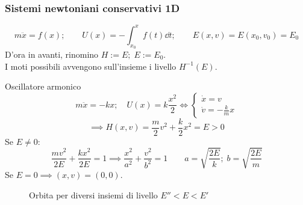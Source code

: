 \subsubsection{Sistemi newtoniani conservativi 1D}
\begin{equation}
    m\ddot{x}= f(x); \qquad U(x)= -\int_{x_0}^{x}f(t)\dd{t}; \qquad E(x,v)=E(x_0,v_0)= E_0
\end{equation}
D'ora in avanti, rinomino $H := E; \; E:=E_0$.\\
I moti possibili avvengono sull'insieme i livello $H^{-1}(E)$.
\begin{example}
    Oscillatore armonico
    \begin{equation}
        m\ddot{x}= -kx; \quad U(x)= k\frac{x^2}{2}
        \iff
        \begin{cases}
            \dot{x}= v\\
            \dot{v}= -\frac{k}{m}x
        \end{cases}
    \end{equation}
    \begin{equation}
        \implies
        H(x,v)= \frac{m}{2}v^2+\frac{k}{2}x^2= E>0
    \end{equation}
    Se $E\neq0$:
    \begin{equation}
        \frac{mv^2}{2E}+\frac{kx^2}{2E}= 1 \implies \frac{x^2}{a^2}+\frac{v^2}{b^2}= 1 \qquad a = \sqrt{\frac{2E}{k}};\; b= \sqrt{\frac{2E}{m}}
    \end{equation}
    Se $E= 0 \implies (x,v)= (0,0)$.

    \begin{figure}[h]
        \centering
        \caption{Orbita per diversi insiemi di livello $E''<E<E'$}
    \end{figure}

\end{example}

